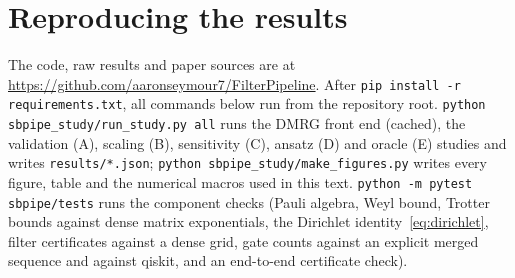 \documentclass[aps,pra,twocolumn,superscriptaddress,nofootinbib]{revtex4-2}
\begin{document}
\section{Reproducing the results}
\label{app:repro}

The code, raw results and paper sources are at \url{https://github.com/aaronseymour7/FilterPipeline}. After
\texttt{pip install -r requirements.txt}, all commands below run from the repository root.
\texttt{python sbpipe\_study/run\_study.py all} runs the DMRG front end (cached), the validation (A),
scaling (B), sensitivity (C), ansatz (D) and oracle (E) studies and writes \texttt{results/*.json};
\texttt{python sbpipe\_study/make\_figures.py} writes every figure, table and the numerical macros used
in this text. \texttt{python -m pytest sbpipe/tests} runs the component checks (Pauli algebra, Weyl
bound, Trotter bounds against dense matrix exponentials, the Dirichlet identity~\eqref{eq:dirichlet},
filter certificates against a dense grid, gate counts against an explicit merged sequence and against
qiskit, and an end-to-end certificate check).
\end{document}

